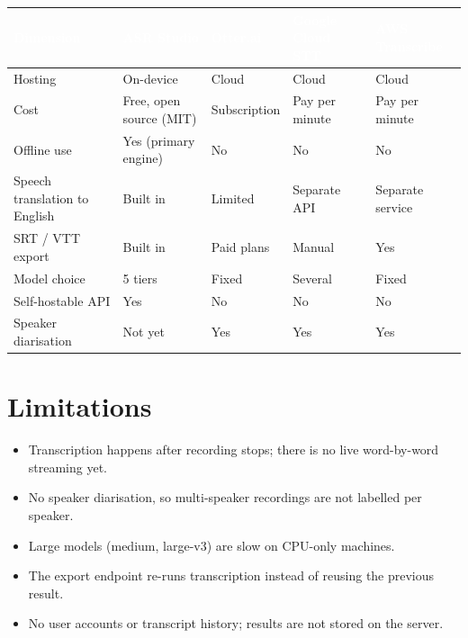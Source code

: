 \documentclass[11pt,a4paper]{article}
\newcommand{\thc}[1]{\textcolor{white}{\bfseries #1}}
\newcommand{\headrow}{\rowcolor{headblue}}
\begin{document}
\begin{tabularx}{\textwidth}{|L{3.0cm}|Y|Y|Y|Y|}
\hline
\headrow \thc{Dimension} & \thc{ASR Studio} & \thc{Otter.ai} & \thc{Google Cloud STT} & \thc{AWS Transcribe} \\ \hline
Hosting & On-device & Cloud & Cloud & Cloud \\ \hline
Cost & Free, open source (MIT) & Subscription & Pay per minute & Pay per minute \\ \hline
Offline use & Yes (primary engine) & No & No & No \\ \hline
Speech translation to English & Built in & Limited & Separate API & Separate service \\ \hline
SRT / VTT export & Built in & Paid plans & Manual & Yes \\ \hline
Model choice & 5 tiers & Fixed & Several & Fixed \\ \hline
Self-hostable API & Yes & No & No & No \\ \hline
Speaker diarisation & Not yet & Yes & Yes & Yes \\ \hline
\end{tabularx}

\section{Limitations}
\begin{itemize}[leftmargin=1.2em,itemsep=1pt]
  \item Transcription happens after recording stops; there is no live word-by-word streaming yet.
  \item No speaker diarisation, so multi-speaker recordings are not labelled per speaker.
  \item Large models (medium, large-v3) are slow on CPU-only machines.
  \item The export endpoint re-runs transcription instead of reusing the previous result.
  \item No user accounts or transcript history; results are not stored on the server.
\end{itemize}
\end{document}
